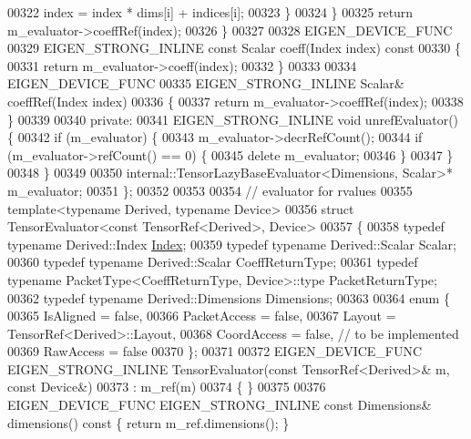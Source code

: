 \begin{DoxyCode}
00322           index = index * dims[i] + indices[i];
00323         \}
00324       \}
00325       \textcolor{keywordflow}{return} m\_evaluator->coeffRef(index);
00326     \}
00327 
00328     EIGEN\_DEVICE\_FUNC
00329     EIGEN\_STRONG\_INLINE \textcolor{keyword}{const} Scalar coeff(Index index)\textcolor{keyword}{ const}
00330 \textcolor{keyword}{    }\{
00331       \textcolor{keywordflow}{return} m\_evaluator->coeff(index);
00332     \}
00333 
00334     EIGEN\_DEVICE\_FUNC
00335     EIGEN\_STRONG\_INLINE Scalar& coeffRef(Index index)
00336     \{
00337       \textcolor{keywordflow}{return} m\_evaluator->coeffRef(index);
00338     \}
00339 
00340   \textcolor{keyword}{private}:
00341     EIGEN\_STRONG\_INLINE \textcolor{keywordtype}{void} unrefEvaluator() \{
00342       \textcolor{keywordflow}{if} (m\_evaluator) \{
00343         m\_evaluator->decrRefCount();
00344         \textcolor{keywordflow}{if} (m\_evaluator->refCount() == 0) \{
00345           \textcolor{keyword}{delete} m\_evaluator;
00346         \}
00347       \}
00348     \}
00349 
00350   internal::TensorLazyBaseEvaluator<Dimensions, Scalar>* m\_evaluator;
00351 \};
00352 
00353 
00354 \textcolor{comment}{// evaluator for rvalues}
00355 \textcolor{keyword}{template}<\textcolor{keyword}{typename} Derived, \textcolor{keyword}{typename} Device>
00356 \textcolor{keyword}{struct }TensorEvaluator<const TensorRef<Derived>, Device>
00357 \{
00358   \textcolor{keyword}{typedef} \textcolor{keyword}{typename} Derived::Index \hyperlink{namespace_eigen_a62e77e0933482dafde8fe197d9a2cfde}{Index};
00359   \textcolor{keyword}{typedef} \textcolor{keyword}{typename} Derived::Scalar Scalar;
00360   \textcolor{keyword}{typedef} \textcolor{keyword}{typename} Derived::Scalar CoeffReturnType;
00361   \textcolor{keyword}{typedef} \textcolor{keyword}{typename} PacketType<CoeffReturnType, Device>::type PacketReturnType;
00362   \textcolor{keyword}{typedef} \textcolor{keyword}{typename} Derived::Dimensions Dimensions;
00363 
00364   \textcolor{keyword}{enum} \{
00365     IsAligned = \textcolor{keyword}{false},
00366     PacketAccess = \textcolor{keyword}{false},
00367     Layout = TensorRef<Derived>::Layout,
00368     CoordAccess = \textcolor{keyword}{false},  \textcolor{comment}{// to be implemented}
00369     RawAccess = \textcolor{keyword}{false}
00370   \};
00371 
00372   EIGEN\_DEVICE\_FUNC EIGEN\_STRONG\_INLINE TensorEvaluator(\textcolor{keyword}{const} TensorRef<Derived>& m, \textcolor{keyword}{const} Device&)
00373       : m\_ref(m)
00374   \{ \}
00375 
00376   EIGEN\_DEVICE\_FUNC EIGEN\_STRONG\_INLINE \textcolor{keyword}{const} Dimensions& dimensions()\textcolor{keyword}{ const }\{ \textcolor{keywordflow}{return} m\_ref.dimensions(); \}

\end{DoxyCode}
